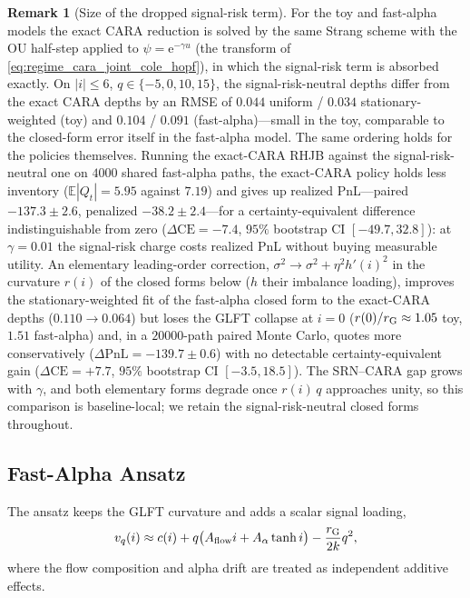 \documentclass[11pt,a4paper]{article}
\newcommand{\E}{\mathbb{E}}
\newcommand{\e}{\mathrm e}
\theoremstyle{plain}
\theoremstyle{definition}
\newtheorem{remark}{Remark}[section]
\begin{document}
\begin{remark}[Size of the dropped signal-risk term]
\label{rem:srn_size}
For the toy and fast-alpha models the exact CARA reduction is solved by the
same Strang scheme with the OU half-step applied to \(\psi=\e^{-\gamma u}\) (the
transform of \eqref{eq:regime_cara_joint_cole_hopf}), in which the signal-risk term is absorbed exactly.  On \(|i|\le6\),
\(q\in\{-5,0,10,15\}\), the signal-risk-neutral depths differ from the exact
CARA depths by an RMSE of \(0.044\) uniform / \(0.034\) stationary-weighted
(toy) and \(0.104\) / \(0.091\) (fast-alpha)---small in the toy, comparable to
the closed-form error itself in the fast-alpha model.  The same ordering holds
for the policies themselves.  Running the exact-CARA RHJB against the
signal-risk-neutral one on \(4000\) shared fast-alpha paths, the exact-CARA
policy holds less inventory (\(\E|Q_t|=5.95\) against \(7.19\)) and gives up
realized PnL---paired \(-137.3\pm2.6\), penalized \(-38.2\pm2.4\)---for a
certainty-equivalent difference indistinguishable from zero
(\(\Delta\mathrm{CE}=-7.4\), \(95\%\) bootstrap CI \([-49.7,32.8]\)): at
\(\gamma=0.01\) the signal-risk charge costs realized PnL without buying
measurable utility.  An elementary
leading-order correction, \(\sigma^2\to\sigma^2+\eta^2h'(i)^2\) in the
curvature \(r(i)\) of the closed forms below (\(h\) their imbalance loading),
improves the stationary-weighted fit of the fast-alpha closed form to the
exact-CARA depths (\(0.110\to0.064\)) but loses the GLFT collapse at \(i=0\)
(\(r(0)/r_{\rm G}\approx1.05\) toy, \(1.51\) fast-alpha) and, in a
\(20000\)-path paired Monte Carlo, quotes more conservatively
(\(\Delta\mathrm{PnL}=-139.7\pm0.6\)) with no detectable certainty-equivalent
gain (\(\Delta\mathrm{CE}=+7.7\), \(95\%\) bootstrap CI \([-3.5,18.5]\)).  The
SRN--CARA gap grows with \(\gamma\), and both elementary forms degrade once
\(r(i)\,q\) approaches unity, so this comparison is baseline-local; we retain
the signal-risk-neutral closed forms throughout.
\end{remark}

\subsection{Fast-Alpha Ansatz}

The ansatz keeps the GLFT curvature and adds a scalar signal loading,
\begin{equation}
v_q(i)\approx c(i)+q\bigl(A_{\rm flow}i+A_\alpha\tanh i\bigr)-\frac{r_{\rm G}}{2k}q^2 ,
\label{eq:fast_alpha_ansatz_value}
\end{equation}
where the flow composition and alpha drift are treated as independent additive effects.
\end{document}
